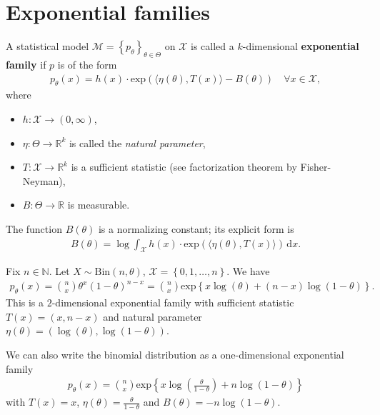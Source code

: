 \section{Exponential families}

\begin{defi}
  A statistical model \( \mathcal{M} = \left\{ p_\theta \right\}_{\theta \in \Theta} \) on \( \mathcal{X} \) is called a \( k \)-dimensional \textbf{exponential family} if \( p \) is of the form
  \begin{align*}
    p_\theta(x) = h(x) \cdot \mathrm{exp}\left( \langle \eta(\theta), T(x) \rangle - B(\theta) \right) \quad \forall x \in \mathcal{X},
  \end{align*}
  where 
  \begin{itemize}
    \item \( h: \mathcal{X} \to (0, \infty) \),
    \item \( \eta: \Theta \to \mathbb{R}^k \) is called the \emph{natural parameter},
    \item \( T: \mathcal{X} \to \mathbb{R}^k \) is a sufficient statistic (see factorization theorem by Fisher-Neyman), 
    \item \( B: \Theta \to \mathbb{R} \) is measurable.
  \end{itemize}
  The function \( B(\theta) \) is a normalizing constant; its explicit form is 
  \begin{align*}
    B(\theta) = \log \int_{\mathcal{X}} h(x) \cdot \mathrm{exp}\left( \langle \eta(\theta), T(x) \rangle \right) \, \mathrm{d}x.
  \end{align*}
\end{defi}

\begin{eg}
  Fix \( n \in \mathbb{N} \). Let \( X \sim \mathrm{Bin}(n, \theta) \), \( \mathcal{X} = \left\{ 0,1, \dots, n \right\} \). We have 
  \begin{align*}
    p_\theta(x) = {n \choose x}\theta^{x} (1 - \theta)^{n - x} = {n \choose x} \mathrm{exp}\left\{ x \log(\theta) + (n- x) \log(1 - \theta) \right\}.
  \end{align*}
  This is a \( 2 \)-dimensional exponential family with sufficient statistic \( T(x) = (x , n-x) \) and natural parameter \( \eta(\theta) = (\log(\theta), \log( 1 - \theta)) \).

  We can also write the binomial distribution as a one-dimensional exponential family
  \begin{align*}
    p_\theta(x) = {n \choose x} \mathrm{exp}\left\{ x \log\left( \frac{\theta}{1 - \theta} \right) + n \log(1 - \theta) \right\}
  \end{align*}
  with \( T(x) = x \), \( \eta(\theta) = \frac{\theta}{1 - \theta} \) and \( B(\theta) = -n \log(1 - \theta) \).
\end{eg}

